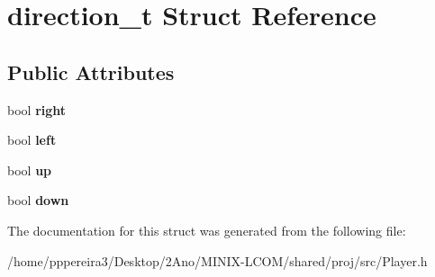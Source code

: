 \hypertarget{structdirection__t}{}\section{direction\+\_\+t Struct Reference}
\label{structdirection__t}
\subsection*{Public Attributes}
\begin{DoxyCompactItemize}
\item 
bool {\bfseries right}
\item 
bool {\bfseries left}
\item 
bool {\bfseries up}
\item 
bool {\bfseries down}
\end{DoxyCompactItemize}


The documentation for this struct was generated from the following file\+:\begin{DoxyCompactItemize}
\item 
/home/pppereira3/\+Desktop/2\+Ano/\+M\+I\+N\+I\+X-\/\+L\+C\+O\+M/shared/proj/src/Player.\+h\end{DoxyCompactItemize}
